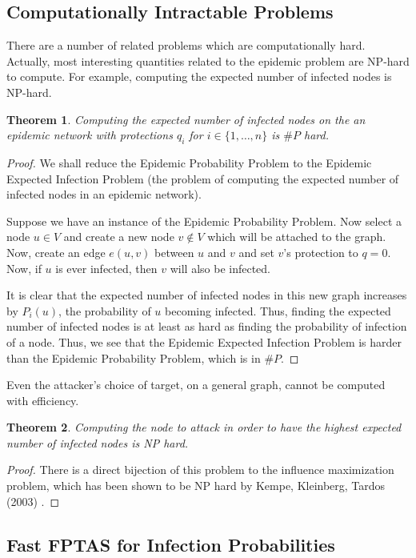 \documentclass{article}
\theoremstyle{plain}
\newtheorem{theorem}{Theorem}
\begin{document}
\subsection{Computationally Intractable Problems}

There are a number of related problems which are computationally hard. Actually, most interesting quantities related to the epidemic problem are NP-hard to compute. For example, computing the expected number of infected nodes is NP-hard.

\begin{theorem}
  Computing the expected number of infected nodes on the an epidemic network with protections $q_i$ for $i \in \{1, \ldots, n\}$ is $\# P$ hard.
\end{theorem}
\begin{proof}
  We shall reduce the Epidemic Probability Problem to the Epidemic Expected Infection Problem (the problem of computing the expected number of infected nodes in an epidemic network).

  Suppose we have an instance of the Epidemic Probability Problem. Now select a node $u \in V$ and create a new node $v \not \in V$ which will be attached to the graph. Now, create an edge $e(u,v)$ between $u$ and $v$ and set $v$'s protection to $q = 0$. Now, if $u$ is ever infected, then $v$ will also be infected.

  It is clear that the expected number of infected nodes in this new graph increases by $P_i(u)$, the probability of $u$ becoming infected. Thus, finding the expected number of infected nodes is at least as hard as finding the probability of infection of a node. Thus, we see that the Epidemic Expected Infection Problem is harder than the Epidemic Probability Problem, which is in $\# P$.
\end{proof}

Even the attacker's choice of target, on a general graph, cannot be computed with efficiency.

\begin{theorem}
  Computing the node to attack in order to have the highest expected number of infected nodes is NP hard.
\end{theorem}
\begin{proof}
  There is a direct bijection of this problem to the influence maximization problem, which has been shown to be NP hard by Kempe, Kleinberg, Tardos (2003) \cite{kempe-kleinberg-tardos03}.
\end{proof}


\subsection{Fast FPTAS for Infection Probabilities}
\end{document}
